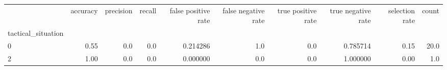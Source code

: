\begin{tabular}{lrrrrrrrrr}
\toprule
{} &  accuracy &  precision &  recall &  false positive rate &  false negative rate &  true positive rate &  true negative rate &  selection rate &  count \\
tactical\_situation &           &            &         &                      &                      &                     &                     &                 &        \\
\midrule
0                  &      0.55 &        0.0 &     0.0 &             0.214286 &                  1.0 &                 0.0 &            0.785714 &            0.15 &   20.0 \\
2                  &      1.00 &        0.0 &     0.0 &             0.000000 &                  0.0 &                 0.0 &            1.000000 &            0.00 &    1.0 \\
\bottomrule
\end{tabular}
